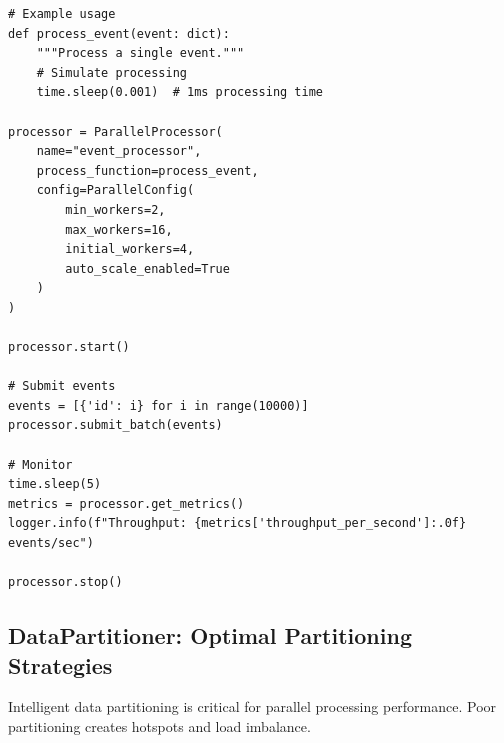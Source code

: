 \begin{lstlisting}[style=python, caption={Parallel Processor with Dynamic Allocation}]
# Example usage
def process_event(event: dict):
    """Process a single event."""
    # Simulate processing
    time.sleep(0.001)  # 1ms processing time

processor = ParallelProcessor(
    name="event_processor",
    process_function=process_event,
    config=ParallelConfig(
        min_workers=2,
        max_workers=16,
        initial_workers=4,
        auto_scale_enabled=True
    )
)

processor.start()

# Submit events
events = [{'id': i} for i in range(10000)]
processor.submit_batch(events)

# Monitor
time.sleep(5)
metrics = processor.get_metrics()
logger.info(f"Throughput: {metrics['throughput_per_second']:.0f} events/sec")

processor.stop()
\end{lstlisting}

\subsection{DataPartitioner: Optimal Partitioning Strategies}

Intelligent data partitioning is critical for parallel processing performance. Poor partitioning creates hotspots and load imbalance.

